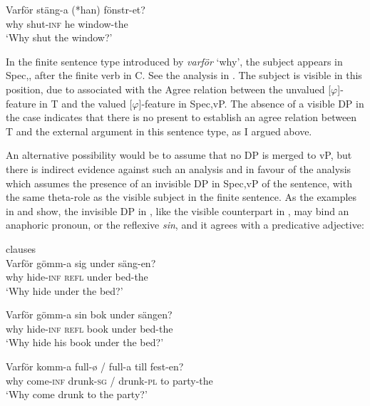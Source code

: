 \documentclass[output=paper]{LSP/langsci}
\begin{document}
   \ex
\gll Varför  stäng-a   (*han)  fönstr-et?\\
        why    shut-\textsc{inf}    he    window-the\\
  \glt   ‘Why shut the window?’
\z
\z

In the finite sentence type introduced by \textit{varför} ‘why’, the subject appears in Spec,, after the finite verb in C. See the analysis in . The subject is visible in this position, due to  associated with the Agree relation between the unvalued [$\varphi $]-feature in T and the valued [$\varphi $]-feature in Spec,vP. The absence of a visible DP in the  case indicates that there is no  present to establish an agree relation between T and the external argument in this sentence type, as I argued above.

   An alternative possibility would be to assume that no DP is merged to vP, but there is indirect evidence against such an analysis and in favour of the analysis which assumes the presence of an invisible DP in Spec,vP of the  sentence, with the same theta-role as the visible subject in the finite sentence. As the examples in  and  show, the invisible DP in , like the visible counterpart in , may bind an anaphoric pronoun, or the  reflexive \textit{sin}, and it agrees with a predicative adjective:

\ea%
    \label{ex:platzack:24}
	    clauses\\
   \ea
\gll Varför   gömm-a     sig     under     säng-en?\\
        why    hide-\textsc{inf}    \textsc{refl}  under    bed-the\\
  \glt   ‘Why hide  under the bed?’    

\ex  
\gll Varför   gömm-a   sin bok    under sängen?\\
    why    hide-\textsc{inf}  \textsc{refl} book   under   bed-the\\
  \glt   ‘Why hide his book under the bed?'

   \ex
\gll Varför  komm-a     full-ø    /  full-a    till fest-en?\\
        why    come-\textsc{inf}  drunk-\textsc{sg} /  drunk-\textsc{pl}   to  party-the\\
  \glt   ‘Why come drunk to the party?’
\z
\z
\end{document}
